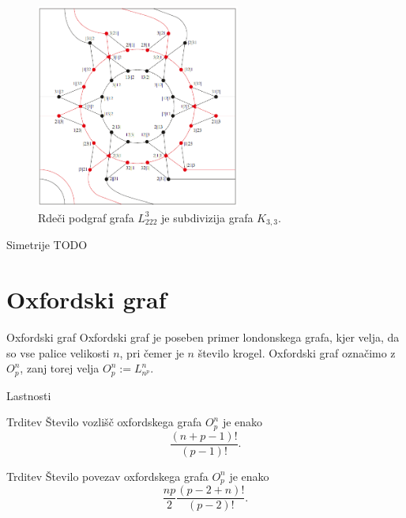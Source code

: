 \documentclass[dvipsnames]{beamer}
\newcommand{\graf}[1][G]{\ensuremath{#1 = (V(#1), E(#1))}}
\DeclareMathOperator {\stopnja} {deg}
\begin{document}
\begin{frame}
    \begin{figure}[h]
        \includegraphics[width=190pt]{../img/tolgraph-O^3_222-subdivision.png}
        \caption{Rdeči podgraf grafa $L_{222}^3$ je subdivizija grafa $K_{3,3}$.}
    \end{figure}
\end{frame}

\begin{frame}{Simetrije}
    TODO
\end{frame}

\section{Oxfordski graf}
\begin{frame}{Oxfordski graf}
    \alert{Oxfordski graf} je poseben primer londonskega grafa, kjer velja, da so vse palice velikosti $n$, pri čemer je $n$ število krogel. Oxfordski graf označimo z $O^n_p$, zanj torej velja $O^n_p := L^n_{n^p}$.
    
\end{frame}

\begin{frame}{Lastnosti}
    \begin{block}{Trditev}
           Število vozlišč oxfordskega grafa $O^n_p$ je enako \[\frac{(n+p-1)!}{(p-1)!}.\]
    \end{block}    
    \begin{block}{Trditev}
        Število povezav oxfordskega grafa $O^n_p$ je enako
        \[ \frac{np}{2} \frac{(p-2+n)!}{(p-2)!} .\]
    \end{block}
    

\end{frame}

%    
\end{document}
